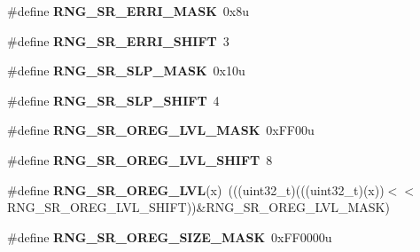 \begin{DoxyCompactItemize}
\item 
\#define {\bfseries R\+N\+G\+\_\+\+S\+R\+\_\+\+E\+R\+R\+I\+\_\+\+M\+A\+SK}~0x8u\hypertarget{group__RNG__Register__Masks_ga3c85bd2671168b6c4deb3d24f258e994}{}\label{group__RNG__Register__Masks_ga3c85bd2671168b6c4deb3d24f258e994}

\item 
\#define {\bfseries R\+N\+G\+\_\+\+S\+R\+\_\+\+E\+R\+R\+I\+\_\+\+S\+H\+I\+FT}~3\hypertarget{group__RNG__Register__Masks_ga83b4268bad929f74a99f2e7df81d7334}{}\label{group__RNG__Register__Masks_ga83b4268bad929f74a99f2e7df81d7334}

\item 
\#define {\bfseries R\+N\+G\+\_\+\+S\+R\+\_\+\+S\+L\+P\+\_\+\+M\+A\+SK}~0x10u\hypertarget{group__RNG__Register__Masks_ga1a51652171cedf780e82c20ff41119f8}{}\label{group__RNG__Register__Masks_ga1a51652171cedf780e82c20ff41119f8}

\item 
\#define {\bfseries R\+N\+G\+\_\+\+S\+R\+\_\+\+S\+L\+P\+\_\+\+S\+H\+I\+FT}~4\hypertarget{group__RNG__Register__Masks_ga07a631716ed84be9e6c0fb94308ac55f}{}\label{group__RNG__Register__Masks_ga07a631716ed84be9e6c0fb94308ac55f}

\item 
\#define {\bfseries R\+N\+G\+\_\+\+S\+R\+\_\+\+O\+R\+E\+G\+\_\+\+L\+V\+L\+\_\+\+M\+A\+SK}~0x\+F\+F00u\hypertarget{group__RNG__Register__Masks_ga5ba45a08f2c283764e959f185747e549}{}\label{group__RNG__Register__Masks_ga5ba45a08f2c283764e959f185747e549}

\item 
\#define {\bfseries R\+N\+G\+\_\+\+S\+R\+\_\+\+O\+R\+E\+G\+\_\+\+L\+V\+L\+\_\+\+S\+H\+I\+FT}~8\hypertarget{group__RNG__Register__Masks_ga2e38a684aa9e1b164fb2a00db509ccf9}{}\label{group__RNG__Register__Masks_ga2e38a684aa9e1b164fb2a00db509ccf9}

\item 
\#define {\bfseries R\+N\+G\+\_\+\+S\+R\+\_\+\+O\+R\+E\+G\+\_\+\+L\+VL}(x)~(((uint32\+\_\+t)(((uint32\+\_\+t)(x))$<$$<$R\+N\+G\+\_\+\+S\+R\+\_\+\+O\+R\+E\+G\+\_\+\+L\+V\+L\+\_\+\+S\+H\+I\+FT))\&R\+N\+G\+\_\+\+S\+R\+\_\+\+O\+R\+E\+G\+\_\+\+L\+V\+L\+\_\+\+M\+A\+SK)\hypertarget{group__RNG__Register__Masks_gae7ebdc9ef90b73144e40809d7b8108fc}{}\label{group__RNG__Register__Masks_gae7ebdc9ef90b73144e40809d7b8108fc}

\item 
\#define {\bfseries R\+N\+G\+\_\+\+S\+R\+\_\+\+O\+R\+E\+G\+\_\+\+S\+I\+Z\+E\+\_\+\+M\+A\+SK}~0x\+F\+F0000u\hypertarget{group__RNG__Register__Masks_ga2f35d6883145b930c34d949640694a6f}{}\label{group__RNG__Register__Masks_ga2f35d6883145b930c34d949640694a6f}


\end{DoxyCompactItemize}
